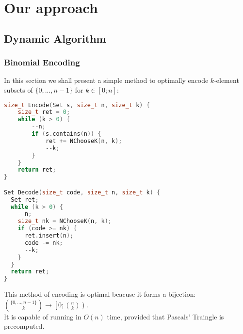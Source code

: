\section{Our approach}
\subsection{Dynamic Algorithm}
\subsubsection{Binomial Encoding~\cite{binomial_encoding}}
In this section we shall present a simple method to optimally encode $k$-element subsets of $\{0,...,n-1\}$ for $k\in\left[0;n\right]$:
\begin{lstlisting}[language=C++]
size_t Encode(Set s, size_t n, size_t k) {
	size_t ret = 0;
	while (k > 0) {
		--n;
		if (s.contains(n)) {
			ret += NChooseK(n, k);
			--k;
		}
	}
	return ret;
}

Set Decode(size_t code, size_t n, size_t k) {
  Set ret;
  while (k > 0) {
    --n;
    size_t nk = NChooseK(n, k);
    if (code >= nk) {
      ret.insert(n);
      code -= nk;
      --k;
    }
  }
  return ret;
}
\end{lstlisting}
This method of encoding is optimal beacuse it forms a bijection: $\binom{\{0,...,n-1\}}{k}\rightarrow\left[0; \binom{n}{k}\right)$.\\
It is capable of running in $O(n)$ time, provided that Pascals' Traingle is precomputed.
